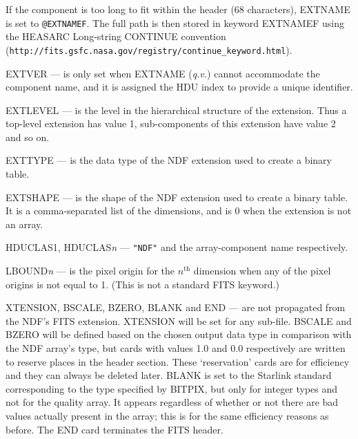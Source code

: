 \documentclass[twoside,11pt]{starlink}
\begin{document}
{{{{              If the component is too long to fit within the header
              (68 characters), EXTNAME is set to  \texttt{@EXTNAMEF}.  The
              full  path is then stored in keyword EXTNAMEF using the HEASARC
              Long-string CONTINUE convention \goodbreak
              (\texttt{http://fits.gsfc.nasa.gov/registry/continue\_keyword.html}).

            \sstitem
            EXTVER --- is only set when EXTNAME ({\em{q.v.}}) cannot accommodate
              the component name, and it is assigned the HDU index to provide a
              unique identifier.

            \sstitem
            EXTLEVEL --- is the level in the hierarchical structure of the
              extension.  Thus a top-level extension has value 1,
              sub-components of this extension have value 2 and so on.

            \sstitem
            EXTTYPE --- is the data type of the NDF extension used to
              create a binary table.

            \sstitem
            EXTSHAPE --- is the shape of the NDF extension used to
              create a binary table.  It is a comma-separated list of the
              dimensions, and is 0 when the extension is not an array.

            \sstitem
            HDUCLAS1, HDUCLAS{\em{n}} --- \texttt{"NDF"} and the
              array-component name respectively.

            \sstitem
            LBOUND{\textit{n}} --- is the pixel origin for the
              $n^{\textrm{th}}$ dimension
              when any of the pixel origins is not equal to 1.  (This is not a
              standard FITS keyword.)

            \sstitem
            XTENSION, BSCALE, BZERO, BLANK and END --- are not propagated
              from the NDF's FITS extension.  XTENSION will be set for
              any sub-file.  BSCALE and BZERO will be defined based on
              the chosen output data type in comparison with the NDF
              array's type, but cards with values 1.0 and 0.0 respectively
              are written to reserve places in the header section.  These
              `reservation' cards are for efficiency and they can always
              be deleted later.  BLANK is set to the Starlink standard
               corresponding to the type
              specified by BITPIX, but only for integer types and not for the
              quality array.  It appears regardless of whether or not there are
              bad values actually present in the array; this is for the same
              efficiency reasons as before.  The END card terminates the FITS header.

}}}}
\end{document}
